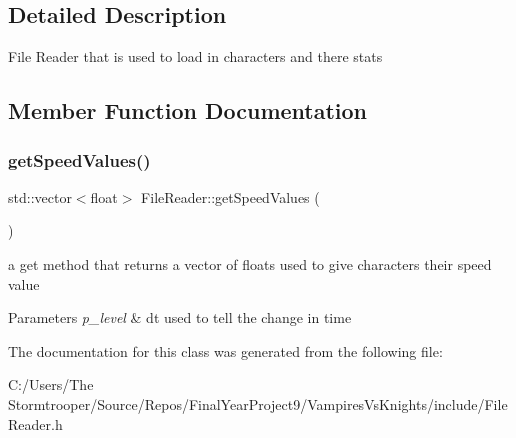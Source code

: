 \subsection{Detailed Description}
File Reader that is used to load in characters and there stats 

\subsection{Member Function Documentation}
\mbox{\label{class_file_reader_ae3af120919f987fec28d577d9e67a7d6}} 
\subsubsection{\texorpdfstring{get\+Speed\+Values()}{getSpeedValues()}}
{\footnotesize\ttfamily std\+::vector$<$float$>$ File\+Reader\+::get\+Speed\+Values (\begin{DoxyParamCaption}{ }\end{DoxyParamCaption})}



a get method that returns a vector of floats used to give characters their speed value 


\begin{DoxyParams}{Parameters}
{\em p\+\_\+level} & dt used to tell the change in time \\
\hline
\end{DoxyParams}


The documentation for this class was generated from the following file\+:\begin{DoxyCompactItemize}
\item 
C\+:/\+Users/\+The Stormtrooper/\+Source/\+Repos/\+Final\+Year\+Project9/\+Vampires\+Vs\+Knights/include/File\+Reader.\+h\end{DoxyCompactItemize}
